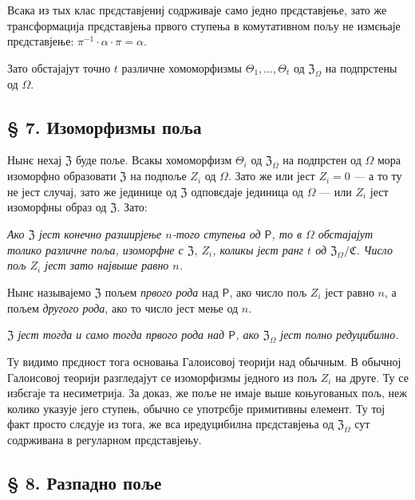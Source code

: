 \documentclass[11pt]{article}
\begin{document}
Всака из тых клас прєдставјениј содрживаје само једно прєдставјење, зато же трансформација прєдставјења првого ступења в комутативном пољу не измєњаје прєдставјење: \(\pi^{-1}\cdot\alpha\cdot\pi=\alpha\).

Зато обстајајут точно \(t\) различне хомоморфизмы \(\Theta_1,\ldots,\Theta_t\) од \(\mathfrak Z_\Omega\) на подпрстены од \(\Omega\).

\subsection*{§ 7. Изоморфизмы поља}\label{die-isomorphismen-eines-koerpers}

Нынє нехај \(\mathfrak Z\) буде поље. Всакы хомоморфизм \(\Theta_i\) од \(\mathfrak Z_\Omega\) на подпрстен од \(\Omega\) мора изоморфно образовати \(\mathfrak Z\) на подпоље \(Z_i\) од \(\Omega\). Зато же или јест \(Z_i=0\) --- а то ту не јест случај, зато же јединице од \(\mathfrak Z\) одповєдаје јединица од \(\Omega\) --- или \(Z_i\) јест изоморфны образ од \(\mathfrak Z\). Зато:

\emph{Ако \(\mathfrak Z\) јест конечно разширјење \(n\)-того ступења од \(\mathsf P\), то в \(\Omega\) обстајајут толико различне поља, изоморфне с \(\mathfrak Z\), \(Z_i\), коликы јест ранг \(t\) од \(\mathfrak Z_\Omega/\mathfrak C\). Число пољ \(Z_i\) јест зато највыше равно \(n\).}

Нынє называјемо \(\mathfrak Z\) пољем \emph{првого рода} над \(\mathsf P\), ако число пољ \(Z_i\) јест равно \(n\), а пољем \emph{другого рода}, ако то число јест мење од \(n\).

\emph{\(\mathfrak Z\) јест тогда и само тогда првого рода над \(\mathsf P\), ако \(\mathfrak Z_\Omega\) јест полно редуцибилно.}

Ту видимо прєдност тога основања Галоисовој теорији над обычным. В обычној Галоисовој теорији разгледајут се изоморфизмы једного из пољ \(Z_i\) на друге. Ту се избєгаје та несиметрија. За доказ, же поље не имаје выше коњугованых пољ, неж колико указује јего ступењ, обычно се употрєбје примитивны елемент. Ту тој факт просто слєдује из тога, же вса иредуцибилна прєдставјења од \(\mathfrak Z_\Omega\) сут содрживана в регуларном прєдставјењу.

\subsection*{§ 8. Разпадно поље}\label{der-zerfaellungskoerper}
\end{document}
